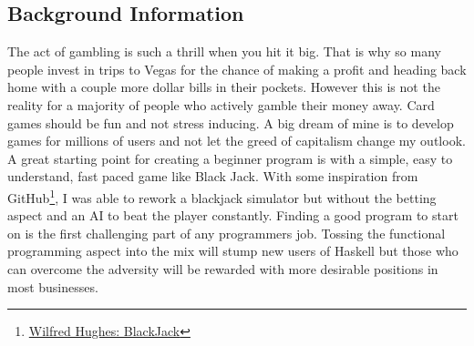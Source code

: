 \documentclass{article}
\begin{document}
    \subsection{Background Information}
    The act of gambling is such a thrill when you hit it big. That is why so many people invest in trips to Vegas for the chance of making a profit and heading back home with a couple more dollar bills in their pockets. However this is not the reality for a majority of people who actively gamble their money away. Card games should be fun and not stress inducing. A big dream of mine is to develop games for millions of users and not let the greed of capitalism change my outlook. A great starting point for creating a beginner program is with a simple, easy to understand, fast paced game like Black Jack. With some inspiration from GitHub\footnote{\href{https://github.com/Wilfred/Blackjack/blob/master/Blackjack.hs}{Wilfred Hughes: BlackJack}}, I was able to rework a blackjack simulator but without the betting aspect and an AI to beat the player constantly. Finding a good program to start on is the first challenging part of any programmers job. Tossing the functional programming aspect into the mix will stump new users of Haskell but those who can overcome the adversity will be rewarded with more desirable positions in most businesses.
    
    \clearpage
\end{document}
